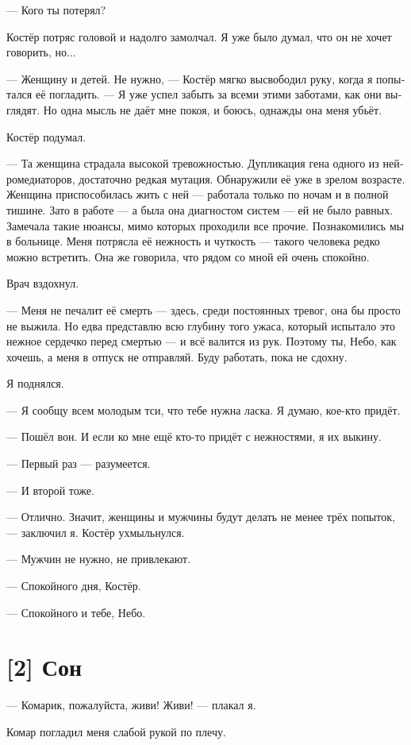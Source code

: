 \documentclass[a4paper,12pt,fleqn]{book}\usepackage{polyglossia}\setdefaultlanguage[babelshorthands=true]{russian}\setotherlanguage{english}\defaultfontfeatures{Ligatures=TeX,Mapping=tex-text}\usepackage{xcolor}\newcommand{\ml}[3]{#2}
\begin{document}
{--- Кого ты потерял?

Костёр потряс головой и надолго замолчал.
Я уже было думал, что он не хочет говорить, но...

--- Женщину и детей.
Не нужно, --- Костёр мягко высвободил руку, когда я попытался её погладить.
--- Я уже успел забыть за всеми этими заботами, как они выглядят.
Но одна мысль не даёт мне покоя, и боюсь, однажды она меня убьёт.

Костёр подумал.

--- Та женщина страдала высокой тревожностью.
Дупликация гена одного из нейромедиаторов, достаточно редкая мутация.
Обнаружили её уже в зрелом возрасте.
Женщина приспособилась жить с ней --- работала только по ночам и в полной тишине.
Зато в работе --- а была она диагностом систем --- ей не было равных.
Замечала такие нюансы, мимо которых проходили все прочие.
Познакомились мы в больнице.
Меня потрясла её нежность и чуткость --- такого человека редко можно встретить.
Она же говорила, что рядом со мной ей очень спокойно.

Врач вздохнул.

--- Меня не печалит её смерть --- здесь, среди постоянных тревог, она бы просто не выжила.
Но едва представлю всю глубину того ужаса, который испытало это нежное сердечко перед смертью --- и всё валится из рук.
Поэтому ты, Небо, как хочешь, а меня в отпуск не отправляй.
Буду работать, пока не сдохну.

Я поднялся.

--- Я сообщу всем молодым тси, что тебе нужна ласка.
Я думаю, кое-кто придёт.

--- Пошёл вон.
И если ко мне ещё кто-то придёт с нежностями, я их выкину.

--- Первый раз --- разумеется.

--- И второй тоже.

--- Отлично.
Значит, женщины и мужчины будут делать не менее трёх попыток, --- заключил я.
Костёр ухмыльнулся.

--- Мужчин не нужно, не привлекают.

--- Спокойного дня, Костёр.

--- Спокойного и тебе, Небо.

\section{[2] Сон}

--- Комарик, пожалуйста, живи!
Живи! --- плакал я.

Комар погладил меня слабой рукой по плечу.

}
\end{document}

